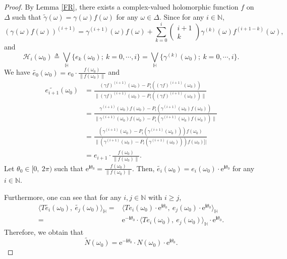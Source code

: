 \documentclass[pdflatex,sn-mathphys-num]{sn-jnl}%
\theoremstyle{thmstyleone}%
\theoremstyle{thmstyletwo}%
\theoremstyle{thmstylethree}%
\theoremstyle{definition}
\theoremstyle{remark}
\begin{document}
    \begin{proof}
    By	Lemma \ref{FR}, there exists a complex-valued holomorphic function $f$ on $\Delta$ such that $\widetilde{\gamma}(\omega)=\gamma(\omega)f(\omega)$ for any $\omega\in\Delta$. Since for any $i\in\mathbb{N}$,
    $$
    (\gamma(\omega)f(\omega))^{(i+1)}=\gamma^{(i+1)}(\omega)f(\omega)+\sum_{k=0}^{i}
    \begin{pmatrix}
    i+1 \\
    k
    \end{pmatrix}\gamma^{(k)}(\omega)f^{(i+1-k)}(\omega),
$$
and
\[
\mathcal{H}_i(\omega_0)\triangleq{\bigvee}_{\mathbb{H}}\{e_k(\omega_0);\ k=0,\cdots,i\}={\bigvee}_{\mathbb{H}}\{\gamma^{(k)}(\omega_0); \ k=0,\cdots,i\}.
\]
    We have $\widetilde{e_{0}}(\omega_0)=e_{0}\cdot\frac{f(\omega_0)}{\|f(\omega_0)\|}$ and
    $$
    \begin{aligned}
    \widetilde{e_{i+1}}(\omega_0) & =\frac{(\gamma f)^{(i+1)}(\omega_0)-P_i((\gamma f)^{(i+1)}(\omega_0))}
    {\|(\gamma f)^{(i+1)}(\omega_0)-P_i((\gamma f)^{(i+1)}(\omega_0))\|} \\
    & =\frac{\gamma^{(i+1)}(\omega_0)f(\omega_0)-P_i(\gamma^{(i+1)}(\omega_0)f(\omega_0))}{\|\gamma^{(i+1)}(\omega_0)f(\omega_0)-P_i(\gamma^{(i+1)}(\omega_0)f(\omega_0))\|} \\
    & =\frac{(\gamma^{(i+1)}(\omega_0)-P_i(\gamma^{(i+1)}(\omega_0)))f(\omega_0)}{\|(\gamma^{(i+1)}(\omega_0)-P_i(\gamma^{(i+1)}(\omega_0)))f(\omega_0)]|} \\
    & =e_{i+1}\cdot\frac{f(\omega_0)}{\|f(\omega_0)\|}.
    \end{aligned}
    $$
    Let $\theta_0\in[0,\ 2\pi)$ such that $\mathrm{e}^{\boldsymbol{i}\theta_0}=\frac{f(\omega_0)}{\|f(\omega_0)\|}$. Then, $\widetilde{e_i}(\omega_0)=e_i(\omega_0)\cdot\mathrm{e}^{\boldsymbol{i}\theta_0}$ for any $i\in\mathbb{N}$.

    Furthermore, one can see that for any $i,j\in\mathbb{N}$ with $i\geq j$,
    \[
    \begin{aligned}
    \langle T\widetilde{e_i}(\omega_0),\ \widetilde{e_j}(\omega_0)\rangle_{\mathbb{H}}=&\langle Te_i(\omega_0)\cdot\mathrm{e}^{\boldsymbol{i}\theta_0},\ e_j(\omega_0)\cdot\mathrm{e}^{\boldsymbol{i}\theta_0}\rangle_{\mathbb{H}} \\
    =&\mathrm{e}^{-\boldsymbol{i}\theta_0}\cdot \langle Te_i(\omega_0),\ e_j(\omega_0)\rangle_{\mathbb{H}} \cdot\mathrm{e}^{\boldsymbol{i}\theta_0}.
    \end{aligned}
\]
Therefore, we obtain that
\[
\widetilde{N}(\omega_0)=\mathrm{e}^{-\boldsymbol{i}\theta_0}\cdot N(\omega_0) \cdot\mathrm{e}^{\boldsymbol{i}\theta_0}.
\]
    \end{proof}
\end{document}
